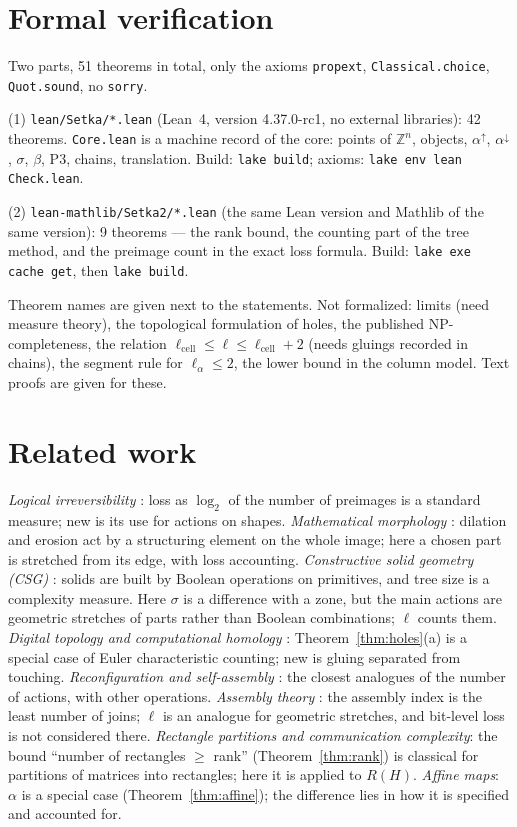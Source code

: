 \documentclass[11pt,a4paper]{article}
\theoremstyle{plain}
\theoremstyle{definition}
\theoremstyle{remark}
\newcommand{\Z}{\mathbb{Z}}
\newcommand{\lc}{\ell_{\mathrm{cell}}}
\begin{document}
\section{Formal verification}

Two parts, 51 theorems in total, only the axioms \texttt{propext}, \texttt{Classical.choice}, \texttt{Quot.sound}, no \texttt{sorry}.

(1) \texttt{lean/Setka/*.lean} (Lean~4, version 4.37.0-rc1, no external libraries): 42 theorems. \texttt{Core.lean} is a machine record of the core: points of $\Z^n$, objects, $\alpha^\uparrow$, $\alpha^\downarrow$, $\sigma$, $\beta$, P3, chains, translation. Build: \texttt{lake build}; axioms: \texttt{lake env lean Check.lean}.

(2) \texttt{lean-mathlib/Setka2/*.lean} (the same Lean version and Mathlib of the same version): 9 theorems — the rank bound, the counting part of the tree method, and the preimage count in the exact loss formula. Build: \texttt{lake exe cache get}, then \texttt{lake build}.

Theorem names are given next to the statements. Not formalized: limits (need measure theory), the topological formulation of holes, the published NP-completeness, the relation $\lc\le\ell\le\lc+2$ (needs gluings recorded in chains), the segment rule for $\ell_\alpha\le2$, the lower bound in the column model. Text proofs are given for these.

\section{Related work}\label{sec:related}

\emph{Logical irreversibility} \cite{landauer,frank}: loss as $\log_2$ of the number of preimages is a standard measure; new is its use for actions on shapes.
\emph{Mathematical morphology} \cite{serra}: dilation and erosion act by a structuring element on the whole image; here a chosen part is stretched from its edge, with loss accounting.
\emph{Constructive solid geometry (CSG)} \cite{requicha}: solids are built by Boolean operations on primitives, and tree size is a complexity measure. Here $\sigma$ is a difference with a zone, but the main actions are geometric stretches of parts rather than Boolean combinations; $\ell$ counts them.
\emph{Digital topology and computational homology} \cite{kong,kaczynski,toriwaki}: Theorem~\ref{thm:holes}(a) is a special case of Euler characteristic counting; new is gluing separated from touching.
\emph{Reconfiguration and self-assembly} \cite{akitaya,soloveichik}: the closest analogues of the number of actions, with other operations.
\emph{Assembly theory} \cite{assembly}: the assembly index is the least number of joins; $\ell$ is an analogue for geometric stretches, and bit-level loss is not considered there.
\emph{Rectangle partitions and communication complexity}: the bound ``number of rectangles $\ge$ rank'' (Theorem~\ref{thm:rank}) is classical for partitions of matrices into rectangles; here it is applied to $R(H)$.
\emph{Affine maps}: $\alpha$ is a special case (Theorem~\ref{thm:affine}); the difference lies in how it is specified and accounted for.
\end{document}
